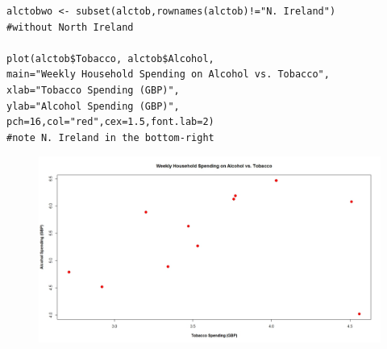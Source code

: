 \documentclass[residuals.tex]{subfiles}
\begin{document}
\begin{framed}
\begin{verbatim}
alctobwo <- subset(alctob,rownames(alctob)!="N. Ireland") 
#without North Ireland

plot(alctob$Tobacco, alctob$Alcohol,
main="Weekly Household Spending on Alcohol vs. Tobacco",
xlab="Tobacco Spending (GBP)",
ylab="Alcohol Spending (GBP)",
pch=16,col="red",cex=1.5,font.lab=2) 
#note N. Ireland in the bottom-right

\end{verbatim}	
\end{framed}
\begin{figure}
\centering
\includegraphics[width=1.3\linewidth]{alcotob}
\caption{}
\label{fig:alcotob}
\end{figure}
\end{document}
